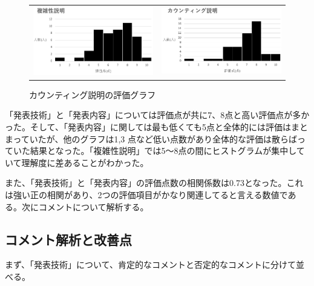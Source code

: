 \begin{figure}[h]
 \begin{tabular}{cc}
  \begin{minipage}[h]{0.45\hsize}
  \centering
 \includegraphics[width=0.7\linewidth]{./figure/hukuzatusei.jpg}
\caption{複雑性説明の評価グラフ}
\label{hukuzatusei}
 \end{minipage} &

\begin{minipage}[h]{0.45\hsize}
  \centering
 \includegraphics[width=0.7\linewidth]{./figure/counting.jpg}
 \caption{カウンティング説明の評価グラフ}
\label{counting}
\end{minipage} 
\end{tabular}
\end{figure}

「発表技術」と「発表内容」については評価点が共に7、8点と高い評価点が多かった。そして、「発表内容」に関しては最も低くても5点と全体的には評価はまとまっていたが、他のグラフは1,3
点など低い点数があり全体的な評価は散らばっていた結果となった。「複雑性説明」では5～8点の間にヒストグラムが集中していて理解度に差あることがわかった。

また、「発表技術」と「発表内容」の評価点数の相関係数は0.73となった。これは強い正の相関があり、2つの評価項目がかなり関連してると言える数値である。次にコメントについて解析する。

\subsection{コメント解析と改善点}
まず、「発表技術」について、肯定的なコメントと否定的なコメントに分けて並べる。

